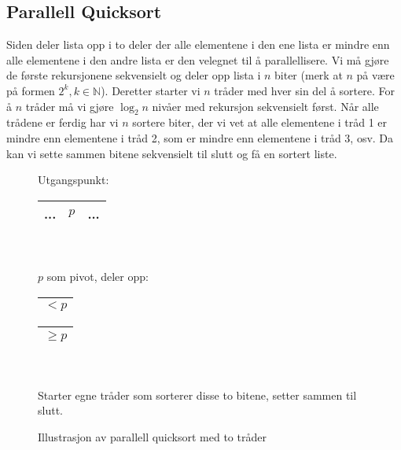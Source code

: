 \subsection{Parallell Quicksort}\label{parquick}
Siden  deler lista opp i to deler der alle elementene i den ene lista er mindre enn alle elementene i den andre lista er den velegnet til å parallellisere. Vi må gjøre de første rekursjonene sekvensielt og deler opp lista i $ n $ biter (merk at $ n $ på være på formen $ 2^k, k\in \mathbb{N} $). Deretter starter vi $ n $ tråder med hver sin del å sortere. For å $ n $ tråder må vi gjøre $ \log_2 n $ nivåer med rekursjon sekvensielt først. Når alle trådene er ferdig har vi $ n $ sortere biter, der vi vet at alle elementene i tråd 1 er mindre enn elementene i tråd 2, som er mindre enn elementene i tråd 3, osv. Da kan vi sette sammen bitene sekvensielt til slutt og få en sortert liste. 
\begin{figure}[H]
\caption{Illustrasjon av parallell quicksort med to tråder}
\centering
Utgangspunkt:\\
\begin{tabular}{| c |c| c |}
\hline
\quad\quad\quad\quad...\quad\quad\quad\quad&$ p $&\quad\quad\quad\quad...\quad\quad\quad\quad\\
\hline
\end{tabular}\\
~\\$ p $ som pivot, deler opp:\\
\begin{tabular}{| c |}
\hline
\quad\quad\quad\quad$ < p $\quad\quad\quad\quad\quad\\
\hline
\end{tabular}\quad\quad
\begin{tabular}{| c |}
\hline
\quad\quad\quad\quad$ \geq p $\quad\quad\quad\quad\quad\\
\hline
\end{tabular}\\
~\\ Starter egne tråder som sorterer disse to bitene, setter sammen til slutt.
\end{figure}

